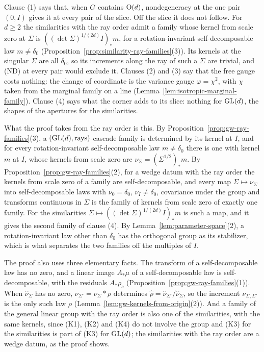 Clause (1) says that, when $G$ contains $\mathrm{O}(d)$, nondegeneracy at the one pair $(0, I)$ gives
it at every pair of the slice. Off the slice it does not follow. For $d \ge 2$ the similarities
with the ray order admit a family whose kernel from scale zero at $\Sigma$ is
$((\det\Sigma)^{1/(2d)}I)_*m$, for a rotation-invariant
self-decomposable law $m \ne \delta_0$ (Proposition~\ref{prop:similarity-ray-families}(3)). Its
kernels at the singular
$\Sigma$ are all $\delta_0$, so its increments along the ray of such a $\Sigma$ are trivial, and
(ND) at every pair would exclude it. Clauses (2) and (3) say that the free gauge costs nothing:
the change of coordinate is the variance gauge $\varphi = \chi^2$, with $\chi$ taken from the
marginal family on a line (Lemma~\ref{lem:isotropic-marginal-family}). Clause (4) says what the corner adds to its slice:
nothing for $\mathrm{GL}(d)$, the shapes of the apertures for the similarities.

What the proof takes from the ray order is this. By
Proposition~\ref{prop:gw-ray-families}(3), a $(\mathrm{GL}(d), \text{rays})$-cascade family is determined by its
kernel at $I$, and for every rotation-invariant self-decomposable law $m \ne \delta_0$ there is one
with kernel $m$ at $I$, whose kernels from scale zero are $\nu_\Sigma = (\Sigma^{1/2})_*m$. By
Proposition~\ref{prop:gw-ray-families}(2), for a wedge datum with the ray order the kernels from scale zero of a family are self-decomposable, and every map $\Sigma \mapsto \nu_\Sigma$ into
self-decomposable laws with $\nu_0 = \delta_0$, $\nu_I \ne \delta_0$, covariance under the group and
transforms continuous in $\Sigma$ is the family of kernels from scale zero of exactly one family. For
the similarities $\Sigma \mapsto ((\det\Sigma)^{1/(2d)}I)_*m$ is such a map, and it gives the second
family of clause (4). By Lemma~\ref{lem:parameter-space}(2), a rotation-invariant law other than
$\delta_0$ has the orthogonal group as its stabilizer, which is what separates the two families off
the multiples of $I$.

The proof also uses three elementary facts. The transform of a self-decomposable law has no zero, and
a linear image $A_*\mu$ of a self-decomposable law is self-decomposable, with the residuals
$A_*\rho_c$ (Proposition~\ref{prop:gw-ray-families}(1)). When
$\widehat\nu_\Sigma$ has no zero, $\nu_{\Sigma'} = \nu_\Sigma * \rho$ determines
$\widehat\rho = \widehat\nu_{\Sigma'}/\widehat\nu_\Sigma$, so the increment $\nu_{\Sigma,\Sigma'}$
is the only such law $\rho$ (Lemma~\ref{lem:gw-kernels-from-origin}(2)). And a family of the general
linear group with the ray order is also one of the similarities, with the same kernels, since (K1),
(K2) and (K4) do not involve the group and (K3) for the similarities is part of (K3) for $\mathrm{GL}(d)$; the
similarities with the ray order are a wedge datum, as the proof shows.

